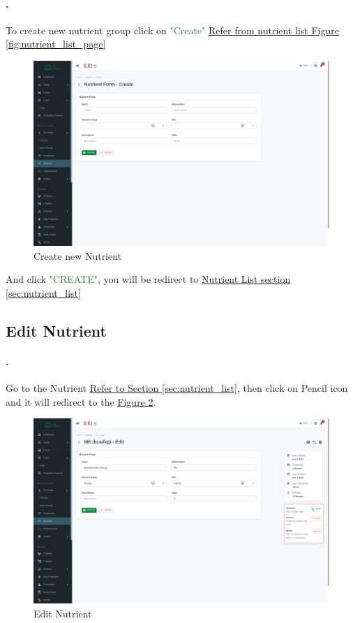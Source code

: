 \paragraph{.}To create new nutrient group click on \textcolor{ForestGreen}{"Create"} \hyperref[fig:nutrient_list_page]{Refer from nutrient list Figure \ref{fig:nutrient_list_page}}
\begin{figure}[h!]
  	\includegraphics[width=15cm]{screenshots/nutrient_create_page.png}
  	\caption{Create new Nutrient }
  	\label{fig:nutrient_create_page}
\end{figure}
And click \textcolor{ForestGreen}{"CREATE"}, you will be redirect to  \hyperref[sec:nutrient_list]{Nutrient List section \ref{sec:nutrient_list}}

\subsection{Edit Nutrient }\label{sec:nutrient_edit}
\setcounter{stepcounter}{1}
\paragraph{.}Go to the Nutrient  \hyperref[sec:nutrient_list]{Refer to Section \ref{sec:nutrient_list}}, then click on Pencil icon and it will redirect to the \hyperref[fig:nutrient_edit_page]{Figure \ref{fig:nutrient_edit_page}}.
\begin{figure}[h!]
  	\includegraphics[width=15cm]{screenshots/nutrient_edit_page.png}
  	\caption{Edit Nutrient }
  	\label{fig:nutrient_edit_page}
\end{figure}

